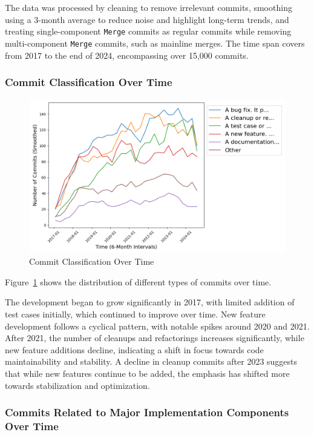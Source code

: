 The data was processed by cleaning to remove irrelevant commits, smoothing using a 3-month average to reduce noise and highlight long-term trends, and treating single-component \texttt{Merge} commits as regular commits while removing multi-component \texttt{Merge} commits, such as mainline merges. The time span covers from 2017 to the end of 2024, encompassing over 15,000 commits.

\subsubsection{Commit Classification Over Time}

\begin{figure}[ht]
    \centering
    \includegraphics[width=\linewidth]{feature-analysis/timeline_commit_classification_smoothed.png}
    \caption{Commit Classification Over Time}
    \label{fig:timeline_commit_classification_smoothed}
\end{figure}

Figure~\ref{fig:timeline_commit_classification_smoothed} shows the distribution of different types of commits over time.

The development began to grow significantly in 2017, with limited addition of test cases initially, which continued to improve over time. New feature development follows a cyclical pattern, with notable spikes around 2020 and 2021. After 2021, the number of cleanups and refactorings increases significantly, while new feature additions decline, indicating a shift in focus towards code maintainability and stability. A decline in cleanup commits after 2023 suggests that while new features continue to be added, the emphasis has shifted more towards stabilization and optimization.

\subsubsection{Commits Related to Major Implementation Components Over Time}

